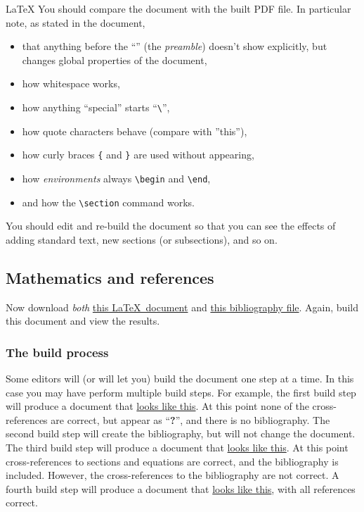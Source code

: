 \begin{chapter}{\LaTeX}
You should compare the document with the built PDF file. In particular note, as stated in the document,
%
\begin{itemize}
  \item that anything before the ``\verb||'' (the \emph{preamble}) doesn't show explicitly, but changes global properties of the document,
  \item how whitespace works,
  \item how anything ``special'' starts ``\verb|\|'',
  \item how quote characters behave (compare with ''this''),
  \item how curly braces \verb|{| and \verb|}| are used without
    appearing,
  \item how \emph{environments} always \verb|\begin| and
      \verb|\end|,
  \item and how the \verb|\section| command works.
\end{itemize}
%
You should edit and re-build the document so that you can see the effects of adding standard text, new sections (or subsections), and so on.

\subsection{Mathematics and references}

Now download \emph{both} \href{https://raw.githubusercontent.com/IanHawke/maths-with-python/master/latex/BasicLatexBibtex.tex}{this \LaTeX\ document} and \href{https://raw.githubusercontent.com/IanHawke/maths-with-python/master/latex/nummeth.bib}{this bibliography file}. Again, build this document and view the results.

\subsubsection{The build process}

Some editors will (or will let you) build the document one step at a time. In this case you may have perform multiple build steps. For example, the first build step will produce a document that \href{https://raw.githubusercontent.com/IanHawke/maths-with-python/master/latex/BasicLatexBibtex_pass1.pdf}{looks like this}. At this point none of the cross-references are correct, but appear as ``\textbf{?}'', and there is no bibliography. The second build step will create the bibliography, but will not change the document. The third build step will produce a document that \href{https://raw.githubusercontent.com/IanHawke/maths-with-python/master/latex/BasicLatexBibtex_pass2.pdf}{looks like this}. At this point cross-references to sections and equations are correct, and the bibliography is included. However, the cross-references to the bibliography are not correct. A fourth build step will produce a document that \href{https://raw.githubusercontent.com/IanHawke/maths-with-python/master/latex/BasicLatexBibtex_pass3.pdf}{looks like this}, with all references correct.


\end{chapter}
